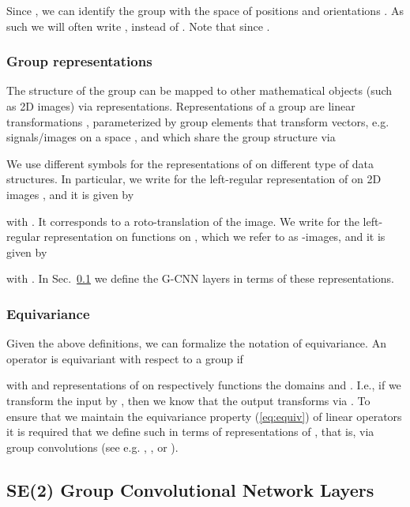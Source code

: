 \documentclass[twocolumn,final]{article}
\begin{document}
Since , we can identify the group  with the space of positions and orientations . As such we will often write , instead of . Note that  since .

\subsubsection{Group representations}
The structure of the group can be mapped to other mathematical objects (such as 2D images) via representations. Representations of a group  are linear transformations , parameterized by group elements  that transform vectors, e.g. signals/images  on a space , and which share the group structure via


We use different symbols for the representations of  on different type of data structures. In particular, we write  for the left-regular representation of  on 2D images , and it is given by

with . It corresponds to a roto-translation of the image. We write  for the left-regular representation on functions  on , which we refer to as -images, and it is given by

with .
In Sec.~\ref{gCNNpipeline} we define the G-CNN layers in terms of these representations. 


\subsubsection{Equivariance}
Given the above definitions, we can formalize the notation of equivariance. An operator  is equivariant with respect to a group  if

with  and  representations of  on respectively functions the domains  and . I.e., if we transform the input by , then we know that the output transforms via . To ensure that we maintain the equivariance property (\ref{eq:equiv}) of linear operators  it is required that we define such  in terms of representations of , that is, via group convolutions (see e.g. \citep[Thm.~1]{bekkers_b-spline_2019}, \citep[Thm.~21]{duits_perceptual_2005}, or \citep[Thm.~6.1]{cohen_general_2018}).


\subsection{SE(2) Group Convolutional Network Layers}
\label{gCNNpipeline}
\end{document}
